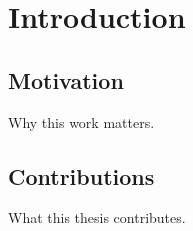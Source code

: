 \chapter{Introduction}
\label{ch:intro}

\section{Motivation}
Why this work matters.

\section{Contributions}
What this thesis contributes.
